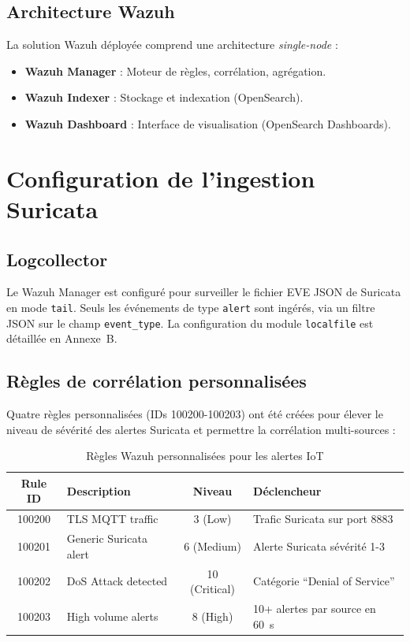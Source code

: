 \subsection{Architecture Wazuh}

La solution Wazuh déployée comprend une architecture \textit{single-node} :
\begin{itemize}
  \item \textbf{Wazuh Manager} : Moteur de règles, corrélation, agrégation.
  \item \textbf{Wazuh Indexer} : Stockage et indexation (OpenSearch).
  \item \textbf{Wazuh Dashboard} : Interface de visualisation (OpenSearch Dashboards).
\end{itemize}

\section{Configuration de l'ingestion Suricata}

\subsection{Logcollector}

Le Wazuh Manager est configuré pour surveiller le fichier EVE JSON de Suricata en mode \texttt{tail}. Seuls les événements de type \texttt{alert} sont ingérés, via un filtre JSON sur le champ \texttt{event\_type}. La configuration du module \texttt{localfile} est détaillée en Annexe~B.

\subsection{Règles de corrélation personnalisées}

Quatre règles personnalisées (IDs 100200-100203) ont été créées pour élever le niveau de sévérité des alertes Suricata et permettre la corrélation multi-sources :

\begin{table}[H]
\centering
\caption{Règles Wazuh personnalisées pour les alertes IoT}
\label{tab:wazuh_rules}
\begin{tabular}{clcl}
\toprule
\textbf{Rule ID} & \textbf{Description} & \textbf{Niveau} & \textbf{Déclencheur} \\
\midrule
100200 & TLS MQTT traffic & 3 (Low) & Trafic Suricata sur port 8883 \\
100201 & Generic Suricata alert & 6 (Medium) & Alerte Suricata sévérité 1-3 \\
100202 & DoS Attack detected & 10 (Critical) & Catégorie ``Denial of Service'' \\
100203 & High volume alerts & 8 (High) & 10+ alertes par source en 60~s \\
\bottomrule
\end{tabular}
\end{table}

